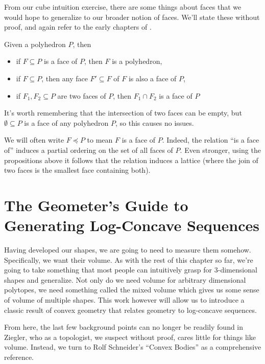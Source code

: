 \documentclass[12pt,oneside]{../../sfsuthesis}
\begin{document}
From our cube intuition exercise, there are some things about faces that we would hope to generalize to our broader notion of faces.
We'll state these without proof, and again refer to the early chapters of \cite{zieglerLecturesPolytopes1995}.
\begin{proposition}
    Given a polyhedron \( P \), then
    \begin{itemize}
        \item if \( F \subseteq P \) is a face of \( P \), then \( F \) is a polyhedron,
        \item if \( F \subseteq P \), then any face \( F' \subseteq F \) of \( F \) is also a face of \( P \),
        \item if \( F_1, F_2 \subseteq P \) are two faces of \( P \), then \( F_1 \cap F_2 \) is a face of \( P \)
    \end{itemize}
\end{proposition}
It's worth remembering that the intersection of two faces can be empty, but \( \emptyset \subseteq P \) is a face of any polyhedron \( P \), so this causes no issues.

We will often write \( F \preceq P \) to mean \( F \) is a face of \( P \).
Indeed, the relation ``is a face of'' induces a partial ordering on the set of all faces of \( P \).
Even stronger, using the propositions above it follows that the relation induces a lattice (where the join of two faces is the smallest face containing both).

\section{The Geometer's Guide to Generating Log-Concave Sequences}
Having developed our shapes, we are going to need to measure them somehow.
Specifically, we want their volume.
As with the rest of this chapter so far, we're going to take something that most people can intuitively grasp for 3-dimensional shapes and generalize.
Not only do we need volume for arbitrary dimensional polytopes, we need something called the mixed volume which gives us some sense of volume of multiple shapes.
This work however will allow us to introduce a classic result of convex geometry that relates geometry to log-concave sequences.

From here, the last few background points can no longer be readily found in Ziegler, who as a topologist, we suspect without proof, cares little for things like volume.
Instead, we turn to Rolf Schneider's ``Convex Bodies'' \cite{schneiderConvexBodiesBrunn2013} as a comprehensive reference.
\end{document}
